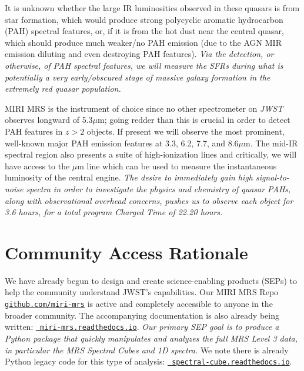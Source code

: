 \smallskip \smallskip
\noindent
It is unknown whether the large IR luminosities observed in these
quasars is from star formation, which would produce strong polycyclic
aromatic hydrocarbon (PAH) spectral features, or, if it is from the hot
dust near the central quasar, which should produce much weaker/no PAH
emission (due to the AGN MIR emission diluting and even destroying PAH
features). {\it Via the detection, or otherwise, of PAH spectral
features, we will measure the SFRs during what is potentially a very
early/obscured stage of massive galaxy formation in the extremely red
quasar population.}

\smallskip \smallskip
\noindent
MIRI MRS is the instrument of choice since no other spectrometer on
{\it JWST} observes longward of 5.3$\mu$m; going redder than this is
crucial in order to detect PAH features in $z>2$ objects.  If present
we will observe the most prominent, well-known major PAH emission
features at 3.3, 6.2, 7.7, and 8.6$\mu$m. The mid-IR spectral region
also presents a suite of high-ionization lines
and critically,  we will have access to the $\mu$m line which 
can be used to measure the instantaneous luminosity of the central engine.
 {\it The desire to immediately
gain high signal-to-noise spectra in order to investigate the physics
and chemistry of quasar PAHs, along with observational overhead
concerns, pushes us to observe each object for 3.6 hours, for a total
program Charged Time of 22.20 hours.}

\section*{Community Access Rationale}
\vspace{-6pt}
\noindent
We have already begun to design and create science-enabling products
(SEPs) to help the community understand JWST's capabilities.  Our MIRI
MRS Repo \href{https://github.com/miri-mrs}{{\tt github.com/miri-mrs}}
is active and completely accessible to anyone in the broader
community.  The accompanying documentation is also already being
written: \href{http://miri-mrs.readthedocs.io/}{{\tt
miri-mrs.readthedocs.io}}.  {\it Our primary SEP goal is to produce a
Python package that quickly manipulates and analyzes the full MRS
Level 3 data, in particular the MRS Spectral Cubes and 1D spectra. }
We note there is already Python legacy code for this type of analysis:
\href{https://spectral-cube.readthedocs.io/}{\tt
spectral-cube.readthedocs.io}. 

